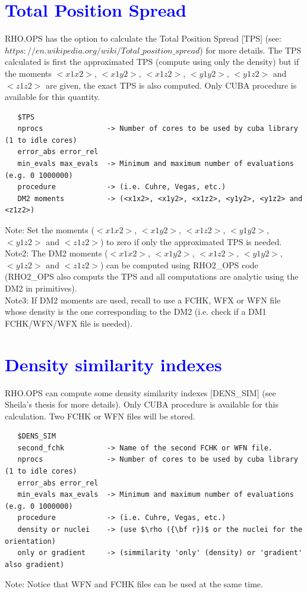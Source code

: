 \documentclass[10pt,a4paper]{article}
\newcommand{\tbl}[1]{{\textcolor{blue}{#1}}}
\begin{document}
{\section{\tbl{\textbf{Total Position Spread}}}
\noindent RHO.OPS has the option to calculate the Total Position Spread $[$TPS$]$ (see: $https://en.wikipedia.org/wiki/Total\_position\_spread$) for more details. The TPS calculated is first the approximated TPS (compute using only the density) but if the moments $<x1x2>$, $<x1y2>$, $<x1z2>$, $<y1y2>$, $<y1z2>$ and $<z1z2>$ are given, the exact TPS is also computed. Only CUBA procedure is available for this quantity. 
\begin{verbatim}
   $TPS
   nprocs               -> Number of cores to be used by cuba library (1 to idle cores) 
   error_abs error_rel    
   min_evals max_evals  -> Minimum and maximum number of evaluations (e.g. 0 1000000)
   procedure            -> (i.e. Cuhre, Vegas, etc.)
   DM2 moments          -> (<x1x2>, <x1y2>, <x1z2>, <y1y2>, <y1z2> and <z1z2>)
\end{verbatim}
Note: Set the moments  ($<x1x2>$, $<x1y2>$, $<x1z2>$, $<y1y2>$, $<y1z2>$ and $<z1z2>$) to zero if only the approximated TPS is needed.\\
Note2: The DM2 moments  ($<x1x2>$, $<x1y2>$, $<x1z2>$, $<y1y2>$, $<y1z2>$ and $<z1z2>$) can be computed using RHO2\_OPS code (RHO2\_OPS also computs the TPS and all computations are analytic using the DM2 in primitives). \\
Note3: If DM2 moments  are used, recall to use a FCHK, WFX or WFN file whose density is the one corresponding to the DM2 (i.e. check if a DM1 FCHK/WFN/WFX file is needed).  
\section{\tbl{\textbf{Density similarity indexes}}}
\noindent RHO.OPS can compute some density similarity indexes $[$DENS\_SIM$]$ (see Sheila's thesis for more details). Only CUBA procedure is available for this calculation. Two FCHK or WFN files will be stored. 
\begin{verbatim}
   $DENS_SIM
   second_fchk          -> Name of the second FCHK or WFN file. 
   nprocs               -> Number of cores to be used by cuba library (1 to idle cores) 
   error_abs error_rel    
   min_evals max_evals  -> Minimum and maximum number of evaluations (e.g. 0 1000000)
   procedure            -> (i.e. Cuhre, Vegas, etc.)
   density or nuclei    -> (use $\rho ({\bf r})$ or the nuclei for the orientation)
   only or gradient     -> (simmilarity 'only' (density) or 'gradient' also gradient)
\end{verbatim}
Note: Notice that WFN and FCHK files can be used at the same time.\\
}
\end{document}
